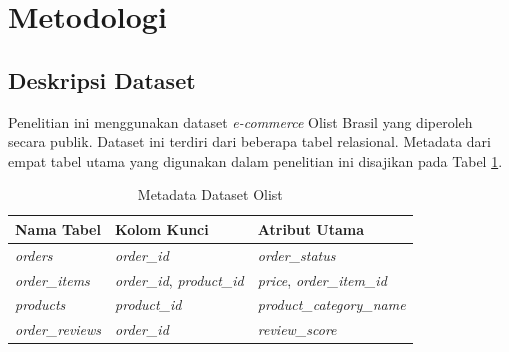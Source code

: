\documentclass[conference]{IEEEtran}
\begin{document}
\section{Metodologi}

\subsection{Deskripsi Dataset}
Penelitian ini menggunakan dataset \textit{e-commerce} Olist Brasil yang diperoleh secara publik. Dataset ini terdiri dari beberapa tabel relasional. Metadata dari empat tabel utama yang digunakan dalam penelitian ini disajikan pada Tabel \ref{tab:dataset}.

\begin{table}[h]
\caption{Metadata Dataset Olist}
\label{tab:dataset}
\centering
\begin{tabular}{lll}
\toprule
\textbf{Nama Tabel} & \textbf{Kolom Kunci} & \textbf{Atribut Utama} \\
\midrule
\textit{orders} & \textit{order\_id} & \textit{order\_status} \\
\textit{order\_items} & \textit{order\_id}, \textit{product\_id} & \textit{price}, \textit{order\_item\_id} \\
\textit{products} & \textit{product\_id} & \textit{product\_category\_name} \\
\textit{order\_reviews} & \textit{order\_id} & \textit{review\_score} \\
\bottomrule
\end{tabular}
\end{table}
\end{document}

